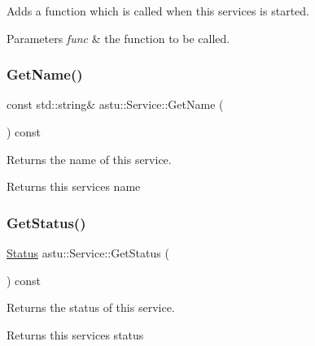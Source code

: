 Adds a function which is called when this services is started.


\begin{DoxyParams}{Parameters}
{\em func} & the function to be called. \\
\hline
\end{DoxyParams}
\mbox{\label{classastu_1_1Service_afa9933498d88c92b649a551d341e657a}} 
\subsubsection{\texorpdfstring{Get\+Name()}{GetName()}}
{\footnotesize\ttfamily const std\+::string\& astu\+::\+Service\+::\+Get\+Name (\begin{DoxyParamCaption}{ }\end{DoxyParamCaption}) const}

Returns the name of this service.

\begin{DoxyReturn}{Returns}
this service\textquotesingle{}s name 
\end{DoxyReturn}
\mbox{\label{classastu_1_1Service_a1b4764263b2e7417a6e0ad3bc4f4950a}} 
\subsubsection{\texorpdfstring{Get\+Status()}{GetStatus()}}
{\footnotesize\ttfamily \hyperlink{classastu_1_1Service_a5ef3b0bb1fb8a504afe708ee4dd8371e}{Status} astu\+::\+Service\+::\+Get\+Status (\begin{DoxyParamCaption}{ }\end{DoxyParamCaption}) const}

Returns the status of this service.

\begin{DoxyReturn}{Returns}
this service\textquotesingle{}s status 
\end{DoxyReturn}
\mbox{\label{classastu_1_1Service_a307be9a1bff02c13431ec5edcc777f97}} 
